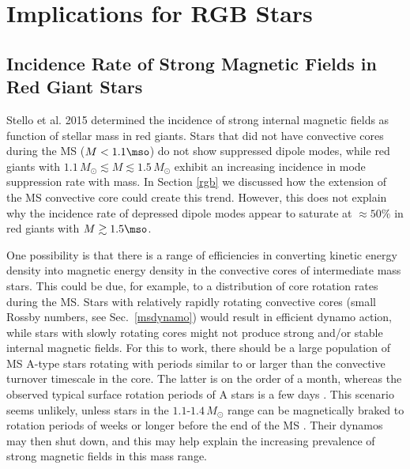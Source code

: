 \section{Implications for RGB Stars}
\subsection{Incidence Rate of Strong Magnetic Fields in Red Giant Stars}
Stello et al. 2015 determined the incidence of strong internal magnetic fields as function of stellar mass in red giants. Stars that did not have convective cores during the MS ($M<1.1\mso$) do not show suppressed dipole modes, while red giants with $1.1 \, M_\odot \lesssim M \lesssim 1.5 \, M_\odot$ exhibit an increasing incidence in mode suppression rate with mass. In Section \ref{rgb} we discussed how the extension of the MS convective core could create this trend. However, this does not explain why the incidence rate of depressed dipole modes appear to saturate at $\approx 50\%$ in red giants with $M \gtrsim 1.5 \mso$.

One possibility is that there is a range of efficiencies in converting kinetic energy density into magnetic energy density in the convective cores of intermediate mass stars. This could be due, for example, to a distribution of core rotation rates during the MS. Stars with relatively rapidly rotating convective cores (small Rossby numbers, see Sec.~\ref{msdynamo}) would result in efficient dynamo action, while stars with slowly rotating cores might not produce strong and/or stable internal magnetic fields. For this to work, there should be a large population of MS A-type stars rotating with periods similar to or larger than the convective turnover timescale in the core. The latter is on the order of a month, whereas the observed typical surface rotation periods of A stars is a few days \citep{Zorec_2012}.
This scenario seems unlikely, unless stars in the $1.1$-$1.4 \, M_\odot$ range can be magnetically braked to rotation periods of weeks or longer before the end of the MS \citep[see][]{VanSaders_2013}. Their dynamos may then shut down, and this may help explain the increasing prevalence of strong magnetic fields in this mass range.

